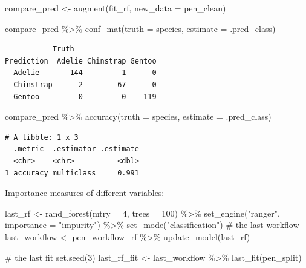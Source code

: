 \documentclass[
  letterpaper,
  DIV=11,
  numbers=noendperiod]{scrreprt}
\newenvironment{Shaded}{\begin{snugshade}}{\end{snugshade}}
\newcommand{\AttributeTok}[1]{\textcolor[rgb]{0.40,0.45,0.13}{#1}}
\newcommand{\CommentTok}[1]{\textcolor[rgb]{0.37,0.37,0.37}{#1}}
\newcommand{\DecValTok}[1]{\textcolor[rgb]{0.68,0.00,0.00}{#1}}
\newcommand{\FunctionTok}[1]{\textcolor[rgb]{0.28,0.35,0.67}{#1}}
\newcommand{\NormalTok}[1]{\textcolor[rgb]{0.00,0.23,0.31}{#1}}
\newcommand{\OtherTok}[1]{\textcolor[rgb]{0.00,0.23,0.31}{#1}}
\newcommand{\SpecialCharTok}[1]{\textcolor[rgb]{0.37,0.37,0.37}{#1}}
\newcommand{\StringTok}[1]{\textcolor[rgb]{0.13,0.47,0.30}{#1}}
\begin{document}
\begin{Shaded}
\begin{Highlighting}[]
\NormalTok{compare\_pred }\OtherTok{\textless{}{-}} \FunctionTok{augment}\NormalTok{(fit\_rf, }\AttributeTok{new\_data =}\NormalTok{ pen\_clean) }

\NormalTok{compare\_pred }\SpecialCharTok{\%\textgreater{}\%} \FunctionTok{conf\_mat}\NormalTok{(}\AttributeTok{truth =}\NormalTok{ species, }\AttributeTok{estimate =}\NormalTok{ .pred\_class)}
\end{Highlighting}
\end{Shaded}

\begin{verbatim}
           Truth
Prediction  Adelie Chinstrap Gentoo
  Adelie       144         1      0
  Chinstrap      2        67      0
  Gentoo         0         0    119
\end{verbatim}

\begin{Shaded}
\begin{Highlighting}[]
\NormalTok{compare\_pred }\SpecialCharTok{\%\textgreater{}\%}  \FunctionTok{accuracy}\NormalTok{(}\AttributeTok{truth =}\NormalTok{ species, }\AttributeTok{estimate =}\NormalTok{ .pred\_class)}
\end{Highlighting}
\end{Shaded}

\begin{verbatim}
# A tibble: 1 x 3
  .metric  .estimator .estimate
  <chr>    <chr>          <dbl>
1 accuracy multiclass     0.991
\end{verbatim}

Importance measures of different variables:

\begin{Shaded}
\begin{Highlighting}[]
\NormalTok{last\_rf }\OtherTok{\textless{}{-}} 
  \FunctionTok{rand\_forest}\NormalTok{(}\AttributeTok{mtry =} \DecValTok{4}\NormalTok{, }\AttributeTok{trees =} \DecValTok{100}\NormalTok{) }\SpecialCharTok{\%\textgreater{}\%} 
  \FunctionTok{set\_engine}\NormalTok{(}\StringTok{"ranger"}\NormalTok{,  }\AttributeTok{importance =} \StringTok{"impurity"}\NormalTok{) }\SpecialCharTok{\%\textgreater{}\%} 
  \FunctionTok{set\_mode}\NormalTok{(}\StringTok{"classification"}\NormalTok{)}
\CommentTok{\# the last workflow}
\NormalTok{last\_workflow }\OtherTok{\textless{}{-}} 
\NormalTok{  pen\_workflow\_rf }\SpecialCharTok{\%\textgreater{}\%} 
  \FunctionTok{update\_model}\NormalTok{(last\_rf)}

\CommentTok{\# the last fit}
\FunctionTok{set.seed}\NormalTok{(}\DecValTok{3}\NormalTok{)}
\NormalTok{last\_rf\_fit }\OtherTok{\textless{}{-}} 
\NormalTok{  last\_workflow }\SpecialCharTok{\%\textgreater{}\%} 
  \FunctionTok{last\_fit}\NormalTok{(pen\_split)}
\end{Highlighting}
\end{Shaded}
\end{document}
